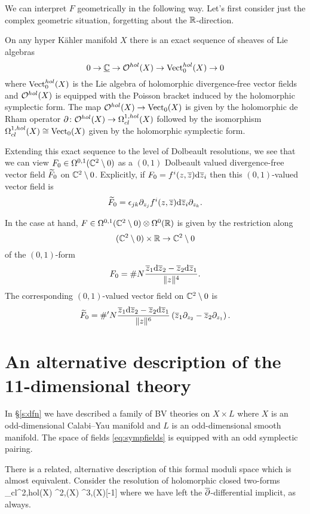 \documentclass[11pt]{amsart}
\begin{document}
We can interpret $F$ geometrically in the following way. 
Let's first consider just the complex geometric situation, forgetting about the $\mathbb R$-direction. 
 
On any hyper K\"ahler manifold $X$ there is an exact sequence of sheaves of Lie algebras
\[
0 \to \smash{\underline{\mathbb C}} \to \mathcal O^{hol}(X) \to {\rm Vect}_0^{hol} (X) \to 0
\]
where ${\rm Vect}^{hol}_0(X)$ is the Lie algebra of holomorphic divergence-free vector fields and $\mathcal O^{hol}(X)$ is equipped with the Poisson bracket induced by the holomorphic symplectic form. 
The map $\mathcal O^{hol}(X) \to {\rm Vect}_0(X)$ is given by the holomorphic de Rham operator $\partial \colon \mathcal O^{hol}(X) \to \Omega^{1,hol}_{cl}(X)$ followed by the isomorphism 
$\Omega^{1,hol}_{cl} (X) \cong {\rm Vect}_0(X)$ given by the holomorphic symplectic form. 

Extending this exact sequence to the level of Dolbeault resolutions, we see that we can view $F_0 \in \Omega^{0,1}(\mathbb C^2 \setminus 0)$ as a $(0,1)$ Dolbeault valued divergence-free vector field $\widetilde{F}_0$ on $\mathbb C^2 \setminus 0$. 
Explicitly, if $F_0 = f^i (z,\overline{z}) {\rm d} \overline{z}_i$ then this $(0,1)$-valued vector field is
\[
\widetilde{F}_0 = \epsilon_{jk} \partial_{z_j} f^i (z,\overline{z}) {\rm d} \overline{z}_i \partial_{z_k} .
\]

In the case at hand, $F \in \Omega^{0,1}(\mathbb C^2 \setminus 0) \otimes \Omega^0(\mathbb R)$ is given by the restriction along 
\[
(\mathbb C^2 \setminus 0) \times \mathbb R \to \mathbb C^2 \setminus 0
\]
of the $(0,1)$-form
\[
F_0 = \# N \frac{\overline{z}_1 {\rm d} \overline{z}_2 - \overline{z}_2 {\rm d} \overline{z}_1}{\|z\|^4} .
\] 
The corresponding $(0,1)$-valued vector field on $\mathbb C^2 \setminus 0$ is
\[
\widetilde{F}_0 = \#' N \frac{\overline{z}_1 {\rm d} \overline{z}_2 - \overline{z}_2 {\rm d} \overline{z}_1}{\|z\|^6} \left(\overline{z}_1 \partial_{z_2} - \overline{z}_2 \partial_{z_1}\right) .
\] 

\appendix 

\section{An alternative description of the 11-dimensional theory} 
In \S \ref{s:dfn} we have described a family of BV theories on $X \times L$ where $X$ is an odd-dimensional Calabi--Yau manifold and $L$ is an odd-dimensional smooth manifold. 
The space of fields \eqref{eq:sympfields} is equipped with an odd symplectic pairing. 


There is a related, alternative description of this formal moduli space which is almost equivalent. 
Consider the resolution of holomorphic closed two-forms 
\beqn\label{eqn:twoform}
\Omega_{cl}^{2,hol}(X) \simeq \Omega^{2,\bu}(X) \xto{\del} \Omega^{3,\bu}(X)[-1] \to \cdots 
\eeqn
where we have left the $\overline{\partial}$-differential implicit, as always. 
\end{document}
